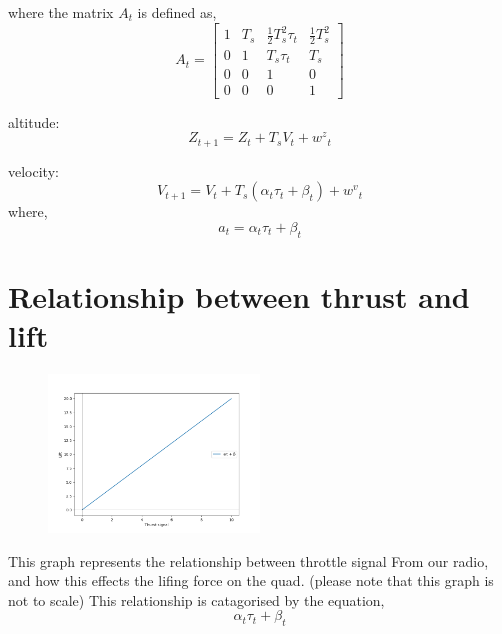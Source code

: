 \documentclass{article}
\begin{document}
where the matrix $A_t$ is defined as,
\begin{equation}
    A_t = 
    \begin{bmatrix}
    1 & T_s & \frac{1}{2} T_s^2 \tau_t & \frac{1}{2} T_s^2 \\
    0 & 1 & T_s \tau_t & T_s \\
    0 & 0 & 1 & 0 \\
    0 & 0 & 0 & 1
    \end{bmatrix}
\end{equation}

altitude:
\begin{equation}
    Z_{t+1} = Z_t + {T_s}{V_t} + {w^z}_t
\end{equation}

velocity:
\begin{equation}
    V_{t+1} = V_t + T_s({\alpha_t}{\tau_t} + \beta_t) + {w^v}_t
\end{equation}
where, 
\begin{equation}
    a_t =
    {\alpha_t}{\tau_t} + \beta_t
\end{equation}

\section{Relationship between thrust and lift}
\begin{figure}[H]
    \centering
    \includegraphics[width=0.5\textwidth]{Figure_1.png}
    \label{fig:fig1}
    \caption{}
\end{figure}
This graph represents the relationship between throttle signal 
From our radio, and how this effects the lifing force on the quad.
(please note that this graph is not to scale)
This relationship is catagorised by the equation, 
\[
\alpha_t\tau_t + \beta_t
\]
\end{document}
